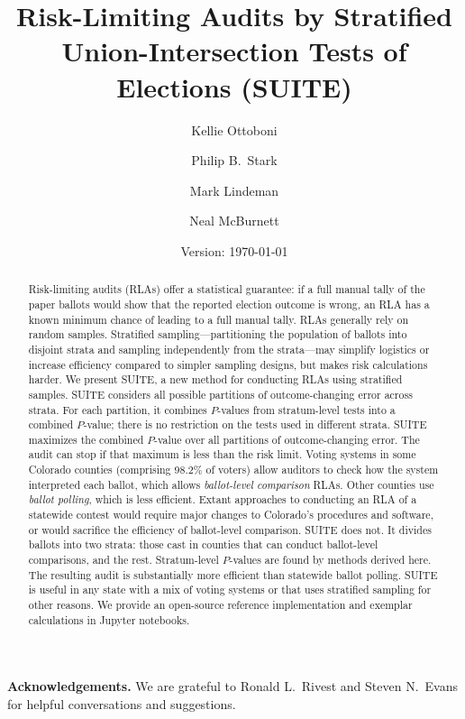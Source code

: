 \documentclass[runningheads]{llncs}
\title{Risk-Limiting Audits by Stratified Union-Intersection Tests of Elections (SUITE)}
\author{
   Kellie Ottoboni\inst{1}\orcidID{0000-0002-9107-3402} \and
   Philip B.~Stark\inst{1}\orcidID{0000-0002-3771-9604} \and
   Mark Lindeman\inst{2}\orcidID{0000-0001-8815-815X} \and
   Neal McBurnett\orcidID{0000-0001-8667-1830} 
}
\institute{
Department of Statistics, University of California, Berkeley, CA, USA \and
Verified Voting Foundation, Philadelphia, PA, USA}
\date{Version: \today}
\begin{document}
\maketitle


\begin{abstract}
Risk-limiting audits (RLAs) offer a statistical guarantee: if a full manual tally of the paper ballots would show that the reported election outcome is wrong, an RLA has a known minimum chance of leading to a full manual tally.
RLAs generally rely on random samples.
Stratified sampling---partitioning the population of ballots into disjoint
strata and sampling independently from the strata---may simplify logistics or increase efficiency compared
to simpler sampling designs, but makes risk calculations harder.
We present SUITE, a new method for conducting RLAs using stratified samples.
SUITE considers all possible partitions of outcome-changing error across strata.
For each partition, it combines $P$-values from stratum-level tests into a combined
$P$-value; there is no restriction on the tests used in different strata.
SUITE maximizes the combined $P$-value over all partitions of outcome-changing error. 
The audit can stop if that maximum is less than the risk limit.
Voting systems in some Colorado counties (comprising 98.2\% of voters)
allow auditors to check how the system interpreted each ballot, 
which allows \emph{ballot-level comparison} RLAs.
Other counties use \emph{ballot polling}, which is less efficient.
Extant approaches to conducting an RLA of a statewide contest would require major changes to 
Colorado's procedures and software, or would sacrifice the efficiency of ballot-level comparison.
SUITE does not. 
It divides ballots into two strata: those cast in counties that can conduct ballot-level comparisons, and the rest.
Stratum-level $P$-values are found by methods derived here.
The resulting audit is substantially more efficient than statewide ballot polling.
SUITE is useful in any state with a mix of voting systems or that uses stratified sampling
for other reasons.
We provide an open-source reference implementation and exemplar calculations in Jupyter notebooks.

\end{abstract}

\noindent
\textbf{Acknowledgements.}
We are grateful to Ronald L.~Rivest and Steven N.~Evans for helpful conversations and suggestions.
\end{document}
